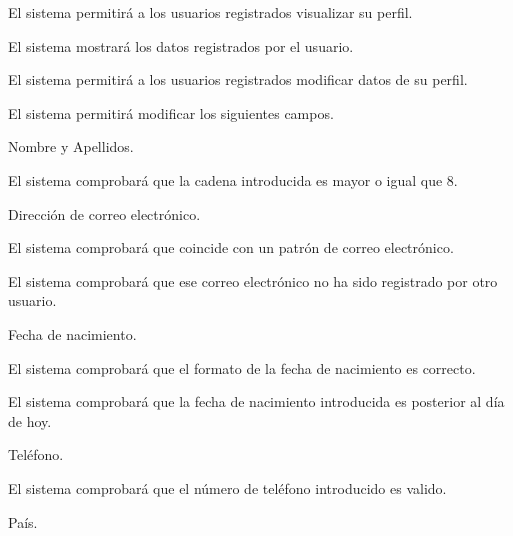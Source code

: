 \begin{enumitem}[label=\bfseries{RPer \arabic*.},leftmargin=*]
	\item El sistema permitirá a los usuarios registrados visualizar su perfil.
	\begin{enumitem}[label*=\bfseries{\arabic*.}]
		\item El sistema mostrará los datos registrados por el usuario.
	\end{enumitem}
	\item El sistema permitirá a los usuarios registrados modificar datos de su perfil.
	\begin{enumitem}[label*=\bfseries{\arabic*.}]
		\item El sistema permitirá modificar los siguientes campos.
		\begin{enumitem}[label*=\bfseries{\arabic*.}]
			\item Nombre y Apellidos.
			\begin{enumitem}[label*=\bfseries{\arabic*.}]
				\item El sistema comprobará que la cadena introducida es mayor o igual que 8.
			\end{enumitem}
			\item Dirección de correo electrónico.
			\begin{enumitem}[label*=\bfseries{\arabic*.}]
				\item El sistema comprobará que coincide con un patrón de correo electrónico.
				\item El sistema comprobará que ese correo electrónico no ha sido registrado por otro usuario.
			\end{enumitem}
			\item Fecha de nacimiento.
			\begin{enumitem}[label*=\bfseries{\arabic*.}]
				\item El sistema comprobará que el formato de la fecha de nacimiento es correcto.
				\item El sistema comprobará que la fecha de nacimiento introducida es posterior al día de hoy.
			\end{enumitem}
			\item Teléfono.
			\begin{enumitem}[label*=\bfseries{\arabic*.}]
				\item El sistema comprobará que el número de teléfono introducido es valido.
			\end{enumitem}
			\item País.
		\end{enumitem}

\end{enumitem}
\end{enumitem}
